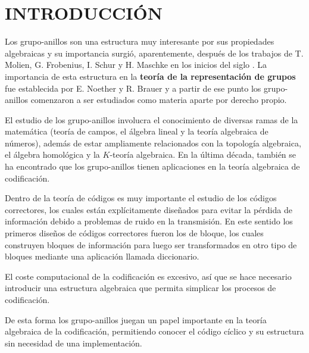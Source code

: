 \chapter{INTRODUCCIÓN}
Los grupo-anillos son una estructura muy interesante por sus propiedades algebraicas y su importancia surgió, aparentemente, después de los trabajos de T. Molien, G. Frobenius, I. Schur y H. Maschke en los inicios del siglo . La importancia de esta estructura en la \textbf{teoría de la representación de grupos} fue establecida por E. Noether y R. Brauer y a partir de ese punto los grupo-anillos comenzaron a ser estudiados como materia aparte por derecho propio. 

El estudio de los grupo-anillos involucra el conocimiento de diversas ramas de la matemática (teoría de campos, el álgebra lineal y la teoría algebraica de números), además de estar ampliamente relacionados con la topología algebraica, el álgebra homológica y la $K$-teoría algebraica. En la última década, también se ha encontrado que los grupo-anillos tienen aplicaciones en la teoría algebraica de codificación.

Dentro de la teoría de códigos es muy importante el estudio de los códigos correctores, los cuales están explícitamente diseñados para evitar la pérdida de información debido a problemas de ruido en la transmisión. En este sentido los primeros diseños de códigos correctores fueron los de bloque, los cuales construyen bloques de información para luego ser transformados en otro tipo de bloques mediante una aplicación llamada diccionario. 

El coste computacional de la codificación es excesivo, así que se hace necesario introducir una estructura algebraica que permita simplicar los procesos de codificación. 

De esta forma los grupo-anillos juegan un papel importante en la teoría algebraica de la codificación, permitiendo conocer el código cíclico y su estructura sin necesidad de una implementación.

